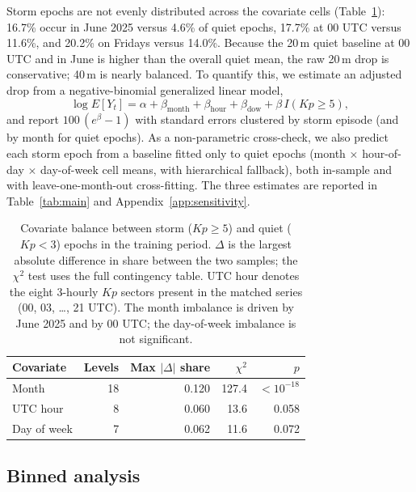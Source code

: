 \documentclass{agujournal2019}
\begin{document}
Storm epochs are not evenly distributed across the covariate cells
(Table~\ref{tab:balance}): 16.7\% occur in June 2025 versus 4.6\% of quiet
epochs, 17.7\% at 00 UTC versus 11.6\%, and 20.2\% on Fridays versus 14.0\%.
Because the 20\,m quiet baseline at 00 UTC and in June is higher than the
overall quiet mean, the raw 20\,m drop is conservative; 40\,m is nearly
balanced. To quantify this, we estimate an adjusted drop from a
negative-binomial generalized linear model,
\begin{equation}
	\log E[Y_t] = \alpha + \beta_{\text{month}} + \beta_{\text{hour}}
	+ \beta_{\text{dow}} + \beta\, I(Kp \ge 5),
	\label{eq:glm}
\end{equation}
and report $100\,(e^{\beta}-1)$ with standard errors clustered by storm
episode (and by month for quiet epochs). As a non-parametric cross-check,
we also predict each storm epoch from a baseline fitted only to quiet
epochs (month $\times$ hour-of-day $\times$ day-of-week cell means, with
hierarchical fallback), both in-sample and with leave-one-month-out
cross-fitting. The three estimates are reported in Table~\ref{tab:main}
and Appendix~\ref{app:sensitivity}.

\begin{table}[h]
	\centering
	\small
	\caption{Covariate balance between storm ($Kp \ge 5$) and quiet
		($Kp < 3$) epochs in the training period. $\Delta$ is the
		largest absolute difference in share between the two samples;
		the $\chi^2$ test uses the full contingency table. UTC hour denotes
		the eight 3-hourly $Kp$ sectors present in the matched series
		(00, 03, \ldots, 21 UTC). The month imbalance is driven by June 2025
		and by 00 UTC; the day-of-week imbalance is not significant.}
	\label{tab:balance}
	\begin{tabular}{lrrrr}
		\toprule
		Covariate & Levels & Max $|\Delta|$ share & $\chi^2$ & $p$ \\
		\midrule
		Month       & 18 & 0.120 & 127.4 & $<10^{-18}$ \\
		UTC hour    & 8  & 0.060 & 13.6  & 0.058 \\
		Day of week & 7  & 0.062 & 11.6  & 0.072 \\
		\bottomrule
	\end{tabular}
\end{table}

\subsection{Binned analysis}
\end{document}
